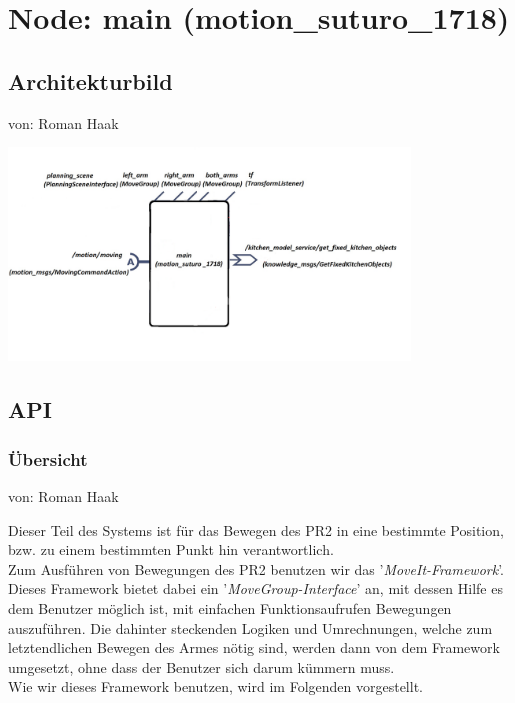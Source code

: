 \documentclass{suturo}
\begin{document}

\makeatletter
\newcommand{\chapterauthor}[1]{%
  {\parindent0pt\vspace*{-27pt}%
  \linespread{0}\small\begin{flushright}von: #1\end{flushright}%
  \par\nobreak\vspace*{0pt}}
  \@afterheading%
}
\makeatother

\section{Node: main (motion\_suturo\_1718)}
\subsection{Architekturbild}
\chapterauthor{Roman Haak}
\begin{center} \includegraphics[width=0.8\textwidth]{img/Architekturbild.png} \end{center}

\subsection{API}
\subsubsection{Übersicht}
\chapterauthor{Roman Haak}
Dieser Teil des Systems ist für das Bewegen des PR2 in eine bestimmte Position, bzw. zu einem bestimmten Punkt hin verantwortlich.\\
Zum Ausführen von Bewegungen des PR2 benutzen wir das '\textit{MoveIt-Framework}'. Dieses Framework bietet dabei ein '\textit{MoveGroup-Interface}' an, mit dessen Hilfe es dem Benutzer möglich ist, mit einfachen Funktionsaufrufen Bewegungen auszuführen. Die dahinter steckenden Logiken und Umrechnungen, welche zum letztendlichen Bewegen des Armes nötig sind, werden dann von dem Framework umgesetzt, ohne dass der Benutzer sich darum kümmern muss.\\
Wie wir dieses Framework benutzen, wird im Folgenden vorgestellt.
\end{document}
